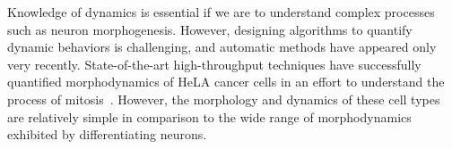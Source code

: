 


Knowledge  of dynamics is  essential if we are  to understand
complex  processes such  as neuron  morphogenesis.  However, designing
algorithms to quantify dynamic  behaviors is challenging, and
automatic methods  have appeared only  very recently. State-of-the-art
high-throughput techniques have successfully quantified morphodynamics
of  HeLA cancer  cells  in an  effort  to understand  the process  of
mitosis~\cite{Held10,Neumann10,Zhu05}.   However,  the morphology  and
dynamics of  these cell types  are relatively simple in  comparison to
the wide range of morphodynamics exhibited by differentiating neurons.



